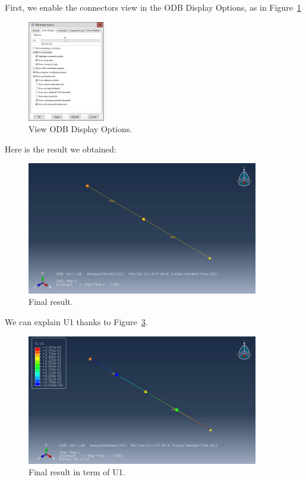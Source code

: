 First, we enable the connectors view in the ODB Display Options, as in Figure~\ref{fig:a24}
\begin{figure}[H]
    \centering
    \includegraphics[width=0.3\textwidth]{Images/ab1/a24.png}
    \caption{View ODB Display Options.}
    \label{fig:a24}
\end{figure}

Here is the result we obtained:
\begin{figure}[H]
    \centering
    \includegraphics[width=0.9\textwidth]{Images/ab1/a25.png}
    \caption{Final result.}
    \label{fig:a25}
\end{figure}

\newpage

We can explain U1 thanks to Figure~\ref{fig:a26}.

\begin{figure}[H]
    \centering
    \includegraphics[width=0.9\textwidth]{Images/ab1/a26.png}
    \caption{Final result in term of U1.}
    \label{fig:a26}
\end{figure}

